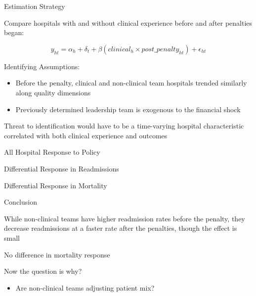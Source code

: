 \documentclass[notes,11pt, aspectratio=169]{beamer}
\newenvironment{wideitemize}{\itemize\addtolength{\itemsep}{10pt}}{\enditemize}
\begin{document}
\begin{frame}{Estimation Strategy}

    Compare hospitals with and without clinical experience before and after penalties began:

    \vspace{3mm}
    
    \begin{equation*}
    y_{ht} = \alpha_{h} + \delta_t + \beta (clinical_h \times post\_penalty_{ht}) + \epsilon_{ht}
    \end{equation*}

    \vspace{10mm}\pause

    Identifying Assumptions:
    \begin{itemize}
        \item Before the penalty, clinical and non-clinical team hospitals trended similarly along quality dimensions
        \item Previously determined leadership team is exogenous to the financial shock
    \end{itemize}

    \vspace{5mm}

    Threat to identification would have to be a time-varying hospital characteristic correlated with both clinical experience and outcomes
\end{frame}

\begin{frame}{All Hospital Response to Policy}\footnotesize

\end{frame}


\begin{frame}{Differential Response in Readmissions}

\end{frame}

\begin{frame}{Differential Response in Mortality}

\end{frame}

\begin{frame}{Conclusion}
\begin{wideitemize}
    \item While non-clinical teams have higher readmission rates before the penalty, they decrease readmissions at a faster rate after the penalties, though the effect is small
    \item No difference in mortality response
\end{wideitemize}

\vspace{10mm}

Now the question is why? 
\begin{itemize}
    \item Are non-clinical teams adjusting patient mix? 
\end{itemize}
\end{frame}
\end{document}
